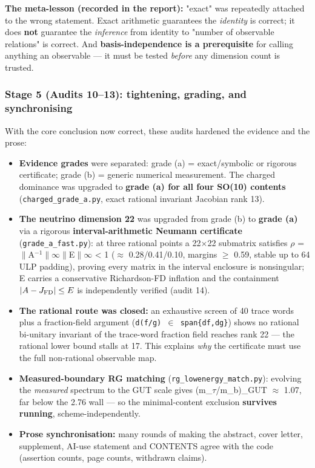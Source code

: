 \documentclass[11pt]{article}
\begin{document}
\textbf{The meta-lesson (recorded in the report):} "exact" was repeatedly attached to the
wrong statement. Exact arithmetic guarantees the \emph{identity} is correct; it does
\textbf{not} guarantee the \emph{inference} from identity to "number of observable relations"
is correct. And \textbf{basis-independence is a prerequisite} for calling anything an
observable --- it must be tested \emph{before} any dimension count is trusted.

\subsubsection*{Stage 5 (Audits 10--13): tightening, grading, and synchronising}

With the core conclusion now correct, these audits hardened the evidence and the
prose:
\begin{itemize}
\item \textbf{Evidence grades} were separated: grade (a) = exact/symbolic or rigorous
  certificate; grade (b) = generic numerical measurement. The charged dominance was
  upgraded to \textbf{grade (a) for all four SO(10) contents} (\texttt{charged\_grade\_a.py},
  exact rational invariant Jacobian rank 13).
\item \textbf{The neutrino dimension 22} was upgraded from grade (b) to \textbf{grade (a)} via a
  rigorous \textbf{interval-arithmetic Neumann certificate} (\texttt{grade\_a\_fast.py}): at three
  rational points a 22$\times$22 submatrix satisfies $\rho$ = $\|$A$^{-1}\|$$\infty$$\|$E$\|$$\infty$ < 1 ($\approx$ 0.28/0.41/0.10,
  margins $\geq$ 0.59, stable up to 64 ULP padding), proving every matrix in the interval
  enclosure is nonsingular; E carries a conservative Richardson-FD inflation and the containment
  $|A-J_{\rm FD}|\le E$ is independently verified (audit 14).
\item \textbf{The rational route was closed:} an exhaustive screen of 40 trace words plus a
  fraction-field argument (\texttt{d(f/g) $\in$ span\{df,dg\}}) shows no rational bi-unitary
  invariant of the trace-word fraction field reaches rank 22 --- the rational lower
  bound stalls at 17. This explains \emph{why} the certificate must use the full
  non-rational observable map.
\item \textbf{Measured-boundary RG matching} (\texttt{rg\_lowenergy\_match.py}): evolving the
  \emph{measured} spectrum to the GUT scale gives (m\_$\tau$/m\_b)\_GUT $\approx$ 1.07, far below the 2.76
  wall --- so the minimal-content exclusion \textbf{survives running}, scheme-independently.
\item \textbf{Prose synchronisation:} many rounds of making the abstract, cover letter,
  supplement, AI-use statement and CONTENTS agree with the code (assertion counts,
  page counts, withdrawn claims).
\end{itemize}
\end{document}
